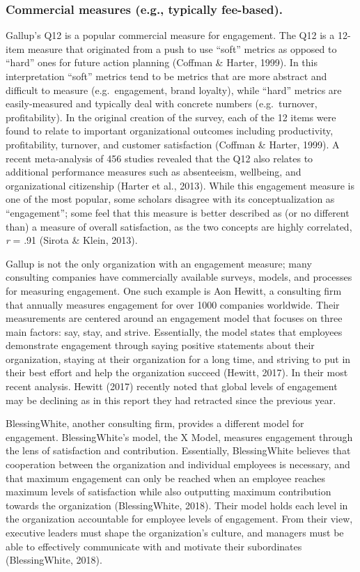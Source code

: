 \documentclass[
  man]{apa6}
\begin{document}
\hypertarget{commercial-measures-e.g.-typically-fee-based.}{%
\subsubsection{Commercial measures (e.g., typically fee-based).}\label{commercial-measures-e.g.-typically-fee-based.}}

Gallup's Q12 is a popular commercial measure for engagement. The Q12 is a 12-item measure that originated from a push to use ``soft'' metrics as opposed to ``hard'' ones for future action planning (Coffman \& Harter, 1999). In this interpretation ``soft'' metrics tend to be metrics that are more abstract and difficult to measure (e.g.~engagement, brand loyalty), while ``hard'' metrics are easily-measured and typically deal with concrete numbers (e.g.~turnover, profitability). In the original creation of the survey, each of the 12 items were found to relate to important organizational outcomes including productivity, profitability, turnover, and customer satisfaction (Coffman \& Harter, 1999). A recent meta-analysis of 456 studies revealed that the Q12 also relates to additional performance measures such as absenteeism, wellbeing, and organizational citizenship (Harter et al., 2013). While this engagement measure is one of the most popular, some scholars disagree with its conceptualization as ``engagement''; some feel that this measure is better described as (or no different than) a measure of overall satisfaction, as the two concepts are highly correlated, \emph{r} = .91 (Sirota \& Klein, 2013).

Gallup is not the only organization with an engagement measure; many consulting companies have commercially available surveys, models, and processes for measuring engagement. One such example is Aon Hewitt, a consulting firm that annually measures engagement for over 1000 companies worldwide. Their measurements are centered around an engagement model that focuses on three main factors: say, stay, and strive. Essentially, the model states that employees demonstrate engagement through saying positive statements about their organization, staying at their organization for a long time, and striving to put in their best effort and help the organization succeed (Hewitt, 2017). In their most recent analysis. Hewitt (2017) recently noted that global levels of engagement may be declining as in this report they had retracted since the previous year.

BlessingWhite, another consulting firm, provides a different model for engagement. BlessingWhite's model, the X Model, measures engagement through the lens of satisfaction and contribution. Essentially, BlessingWhite believes that cooperation between the organization and individual employees is necessary, and that maximum engagement can only be reached when an employee reaches maximum levels of satisfaction while also outputting maximum contribution towards the organization (BlessingWhite, 2018). Their model holds each level in the organization accountable for employee levels of engagement. From their view, executive leaders must shape the organization's culture, and managers must be able to effectively communicate with and motivate their subordinates (BlessingWhite, 2018).
\end{document}
